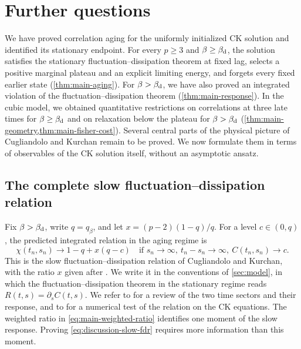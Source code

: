 \chapter{Further questions}\label{sec:discussion}

We have proved correlation aging for the uniformly initialized CK solution and identified its stationary endpoint. For every $p\ge3$ and $\beta\ge\beta_{\mathrm d}$, the solution satisfies the stationary fluctuation--dissipation theorem at fixed lag, selects a positive marginal plateau and an explicit limiting energy, and forgets every fixed earlier state (\cref{thm:main-aging}). For $\beta>\beta_{\mathrm d}$, we have also proved an integrated violation of the fluctuation--dissipation theorem (\cref{thm:main-response}). In the cubic model, we obtained quantitative restrictions on correlations at three late times for $\beta\ge\beta_{\mathrm d}$ and on relaxation below the plateau for $\beta>\beta_{\mathrm d}$ (\cref{thm:main-geometry,thm:main-fisher-cost}). Several central parts of the physical picture of Cugliandolo and Kurchan \cite{ck1993} remain to be proved. We now formulate them in terms of observables of the CK solution itself, without an asymptotic ansatz.

\section{The complete slow fluctuation--dissipation relation}\label{sec:discussion-fdr}

Fix $\beta>\beta_{\mathrm d}$, write $q=q_\beta$, and let $x=(p-2)(1-q)/q$. For a level $c\in(0,q)$, the predicted integrated relation in the aging regime is
\begin{equation}
 \chi(t_n,s_n)\longrightarrow 1-q+x(q-c)
 \quad\text{if }s_n\to\infty,\ t_n-s_n\to\infty,
 \ C(t_n,s_n)\to c.
 \label{eq:discussion-slow-fdr}
\end{equation}
This is the slow fluctuation--dissipation relation of Cugliandolo and Kurchan, with the ratio $x$ given after \cite[Equation~(12)]{ck1993}. We write it in the conventions of \cref{sec:model}, in which the fluctuation--dissipation theorem in the stationary regime reads $R(t,s)=\partial_sC(t,s)$. We refer to \cite[Sections~3.3--3.4]{bckm1998} for a review of the two time sectors and their response, and to \cite{kimlatz2001} for a numerical test of the relation on the CK equations. The weighted ratio in \eqref{eq:main-weighted-ratio} identifies one moment of the slow response. Proving \eqref{eq:discussion-slow-fdr} requires more information than this moment.

